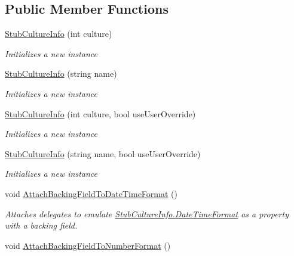 \subsection*{Public Member Functions}
\begin{DoxyCompactItemize}
\item 
\hyperlink{class_system_1_1_globalization_1_1_fakes_1_1_stub_culture_info_a51945a854696a59c564096e611592000}{Stub\-Culture\-Info} (int culture)
\begin{DoxyCompactList}\small\item\em Initializes a new instance\end{DoxyCompactList}\item 
\hyperlink{class_system_1_1_globalization_1_1_fakes_1_1_stub_culture_info_ac49c3166260401e6c3a74c47f983540f}{Stub\-Culture\-Info} (string name)
\begin{DoxyCompactList}\small\item\em Initializes a new instance\end{DoxyCompactList}\item 
\hyperlink{class_system_1_1_globalization_1_1_fakes_1_1_stub_culture_info_a1e80b092758653966457f0c78d719a26}{Stub\-Culture\-Info} (int culture, bool use\-User\-Override)
\begin{DoxyCompactList}\small\item\em Initializes a new instance\end{DoxyCompactList}\item 
\hyperlink{class_system_1_1_globalization_1_1_fakes_1_1_stub_culture_info_aef68a6eb37a133ffcb096ba647a50d6c}{Stub\-Culture\-Info} (string name, bool use\-User\-Override)
\begin{DoxyCompactList}\small\item\em Initializes a new instance\end{DoxyCompactList}\item 
void \hyperlink{class_system_1_1_globalization_1_1_fakes_1_1_stub_culture_info_afa775b88bb6b3c09fa405a3c63d8edaa}{Attach\-Backing\-Field\-To\-Date\-Time\-Format} ()
\begin{DoxyCompactList}\small\item\em Attaches delegates to emulate \hyperlink{class_system_1_1_globalization_1_1_fakes_1_1_stub_culture_info_ae12bc82e4a539805cf30e4630469635c}{Stub\-Culture\-Info.\-Date\-Time\-Format} as a property with a backing field.\end{DoxyCompactList}\item 
void \hyperlink{class_system_1_1_globalization_1_1_fakes_1_1_stub_culture_info_a8b4fc299b75d64d39abae87894b34859}{Attach\-Backing\-Field\-To\-Number\-Format} ()

\end{DoxyCompactItemize}
